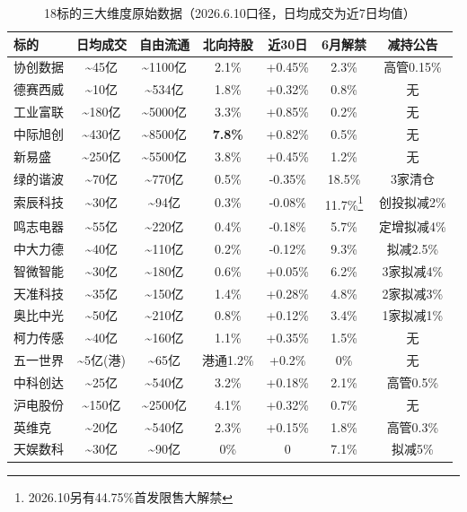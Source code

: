 \begin{table}[H]
\centering\scriptsize
\renewcommand{\arraystretch}{1.1}
\begin{tabularx}{\textwidth}{l c c c c c c}
\toprule
\textbf{标的} & \textbf{日均成交} & \textbf{自由流通} & \textbf{北向持股} & \textbf{近30日} & \textbf{6月解禁} & \textbf{减持公告} \\
\midrule
协创数据 & \textasciitilde45亿 & \textasciitilde1100亿 & 2.1\% & +0.45\% & 2.3\% & 高管0.15\% \\
德赛西威 & \textasciitilde10亿 & \textasciitilde534亿 & 1.8\% & +0.32\% & 0.8\% & 无 \\
工业富联 & \textasciitilde180亿 & \textasciitilde5000亿 & 3.3\% & +0.85\% & 0.2\% & 无 \\
中际旭创 & \textasciitilde430亿 & \textasciitilde8500亿 & \textbf{7.8\%} & +0.82\% & 0.5\% & 无 \\
新易盛 & \textasciitilde250亿 & \textasciitilde5500亿 & 3.8\% & +0.45\% & 1.2\% & 无 \\
绿的谐波 & \textasciitilde70亿 & \textasciitilde770亿 & \textcolor{riskred}{0.5\%} & \textcolor{riskred}{-0.35\%} & \textcolor{riskred}{18.5\%} & \textcolor{riskred}{3家清仓} \\
索辰科技 & \textasciitilde30亿 & \textasciitilde94亿 & \textcolor{riskred}{0.3\%} & -0.08\% & \textcolor{riskred}{11.7\%\footnote{2026.10另有44.75\%首发限售大解禁}} & 创投拟减2\% \\
鸣志电器 & \textasciitilde55亿 & \textasciitilde220亿 & \textcolor{riskred}{0.4\%} & -0.18\% & 5.7\% & 定增拟减4\% \\
中大力德 & \textasciitilde40亿 & \textasciitilde110亿 & \textcolor{riskred}{0.2\%} & -0.12\% & 9.3\% & 拟减2.5\% \\
智微智能 & \textasciitilde30亿 & \textasciitilde180亿 & 0.6\% & +0.05\% & 6.2\% & 3家拟减4\% \\
天准科技 & \textasciitilde35亿 & \textasciitilde150亿 & 1.4\% & +0.28\% & 4.8\% & 2家拟减3\% \\
奥比中光 & \textasciitilde50亿 & \textasciitilde210亿 & 0.8\% & +0.12\% & 3.4\% & 1家拟减1\% \\
柯力传感 & \textasciitilde40亿 & \textasciitilde160亿 & 1.1\% & +0.35\% & 1.5\% & 无 \\
五一世界 & \textasciitilde5亿(港) & \textasciitilde65亿 & 港通1.2\% & +0.2\% & 0\% & 无 \\
中科创达 & \textasciitilde25亿 & \textasciitilde540亿 & 3.2\% & +0.18\% & 2.1\% & 高管0.5\% \\
沪电股份 & \textasciitilde150亿 & \textasciitilde2500亿 & 4.1\% & +0.32\% & 0.7\% & 无 \\
英维克 & \textasciitilde20亿 & \textasciitilde540亿 & 2.3\% & +0.15\% & 1.8\% & 高管0.3\% \\
天娱数科 & \textasciitilde30亿 & \textasciitilde90亿 & \textcolor{riskred}{0\%} & 0 & 7.1\% & 拟减5\% \\
\bottomrule
\end{tabularx}
\caption{18标的三大维度原始数据（2026.6.10口径，日均成交为近7日均值）}
\end{table}

